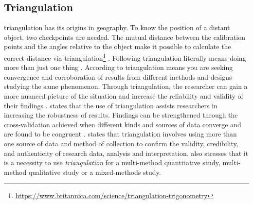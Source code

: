 \subsection{Triangulation}
\label{sub:triangulation}
\Gls{triangulation} has its origins in geography. To know the position of a distant object, two checkpoints are needed. The mutual distance between the calibration points and the angles relative to the object make it possible to calculate the correct distance via triangulation\footnote{\url{https://www.britannica.com/science/triangulation-trigonometry}} \parencite[p.~88]{Mortelmans2018}. Following \textcite[p.~88]{Recker2013} \gls{triangulation} literally means doing more than just one thing \parencite[p.~88]{Recker2013}. According to \textcite[p.~110]{Recker2013} \gls{triangulation} means you are seeking convergence and corroboration of results from different methods and designs studying the same phenomenon. Through \gls{triangulation}, the researcher can gain a more nuanced picture of the situation and increase the reliability and validity of their findings \parencite[p.~88]{Recker2013}. \textcite[p.~88]{Recker2013} states that the use of \gls{triangulation} assists researchers in increasing the \gls{robustness} of results. Findings can be strengthened through the cross-validation achieved when different kinds and sources of data converge and are found to be congruent \parencite[p.~88]{Recker2013}. \textcite[p.~207]{Saunders2015} states that \gls{triangulation} involves using more than one source of data and method of collection to confirm the validity, credibility, and authenticity of research data, analysis and interpretation. \textcite[p.~207]{Saunders2015} also stresses that it is a necessity to use \textit{\gls{triangulation}} for a multi-method quantitative study, multi-method qualitative study or a mixed-methods study.

